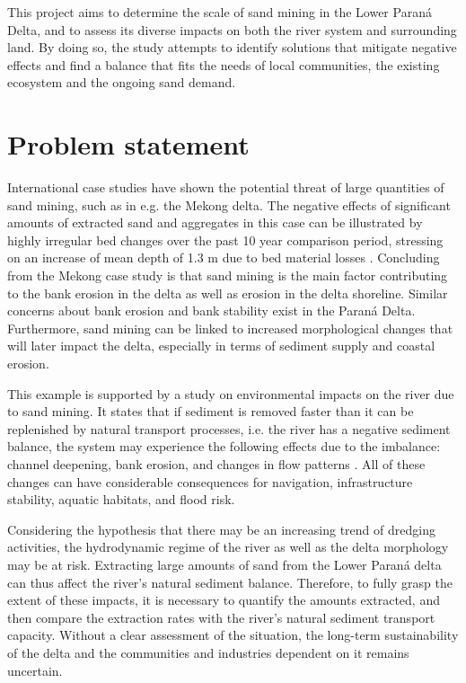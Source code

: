 This project aims to determine the scale of sand mining in the Lower Paraná Delta, and to assess its diverse impacts on both the river system and surrounding land. By doing so, the study attempts to identify solutions that mitigate negative effects and find a balance that fits the needs of local communities, the existing ecosystem and the ongoing sand demand.

\section{Problem statement}

International case studies have shown the potential threat of large quantities of sand mining, such as in e.g. the Mekong delta. The negative effects of significant amounts of extracted sand and aggregates in this case can be illustrated by highly irregular bed changes over the past 10 year comparison period, stressing on an increase of mean depth of 1.3 m due to bed material losses \autocite{brunierRecentMorphologicalChanges2014}. Concluding from the Mekong case study is that sand mining is the main factor contributing to the bank erosion in the delta as well as erosion in the delta shoreline. Similar concerns about bank erosion and bank stability exist in the Paraná Delta. Furthermore, sand mining can be linked to increased morphological changes that will later impact the delta, especially in terms of sediment supply and coastal erosion.

This example is supported by a study on environmental impacts on the river due to sand mining. It states that if sediment is removed faster than it can be replenished by natural transport processes, i.e. the river has a negative sediment balance, the system may experience the following effects due to the imbalance: channel deepening, bank erosion, and changes in flow patterns \autocite{rentierEnvironmentalImpactsRiver2022}. All of these changes can have considerable consequences for navigation, infrastructure stability, aquatic habitats, and flood risk. 

Considering the hypothesis that there may be an increasing trend of dredging activities, the hydrodynamic regime of the river as well as the delta morphology may be at risk. Extracting large amounts of sand from the Lower Paraná delta can thus affect the river's natural sediment balance. Therefore, to fully grasp the extent of these impacts, it is necessary to quantify the amounts extracted, and then compare the extraction rates with the river’s natural sediment transport capacity. Without a clear assessment of the situation, the long-term sustainability of the delta and the communities and industries dependent on it remains uncertain.

